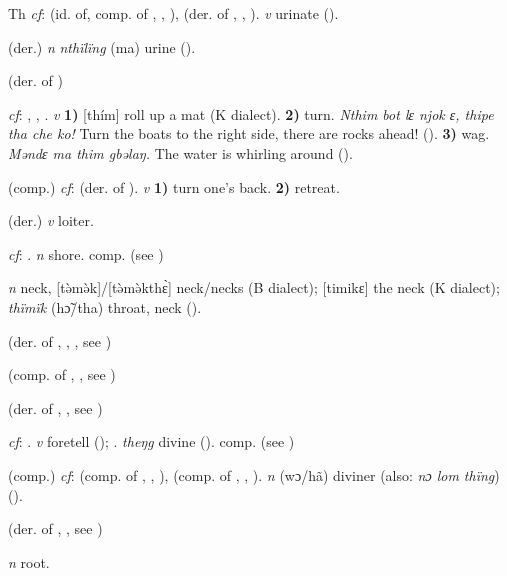 \begin{letter}{Th}
 \textit{cf}:  (id. of, comp. of , , ),  (der. of , , ). \textit{v} urinate (\citealt{Pichl1967}). 

 (der.) \textit{n} \textit{nthïlïng} (ma) urine (\citealt{Pichl1967}).

 (der. of ) 

 \textit{cf}: , , . \textit{v} \textbf{1)} [thím] roll up a mat (K dialect). \textbf{2)} turn. \textit{Nthim bot lɛ njok ɛ, thipe tha che ko!} Turn the boats to the right side, there are rocks ahead! (\citealt{Pichl1967}). \textbf{3)} wag. \textit{Məndɛ ma thim gbəlaŋ.} The water is whirling around (\citealt{Pichl1967}). 

 (comp.) \textit{cf}:  (der. of ). \textit{v} \textbf{1)} turn one's back. \textbf{2)} retreat.

 (der.) \textit{v} loiter.

 \textit{cf}: . \textit{n} shore. comp.  (see ) 

 \textit{n} neck, [tə̀mə̀k]/[tə̀mə̀kthɛ̀] neck/necks (B dialect); [timikɛ] the neck (K dialect); \textit{thïmïk} (hɔ̃/tha) throat, neck (\citealt{Pichl1967}). 

 (der. of , , , see ) 

 (comp. of , , see ) 

 (der. of , , see ) 

 \textit{cf}: . \textit{v} foretell (\citealt{Pichl1967}); . \textit{theŋg} divine (\citealt{Hall1938}). comp.  (see ) 

 (comp.) \textit{cf}:  (comp. of , , ),  (comp. of , , ). \textit{n} (wɔ/hã) diviner (also: \textit{nɔ lom thïng}) (\citealt{Pichl1967}).

 (der. of , , see ) 

 \textit{n} root.


\end{letter}
